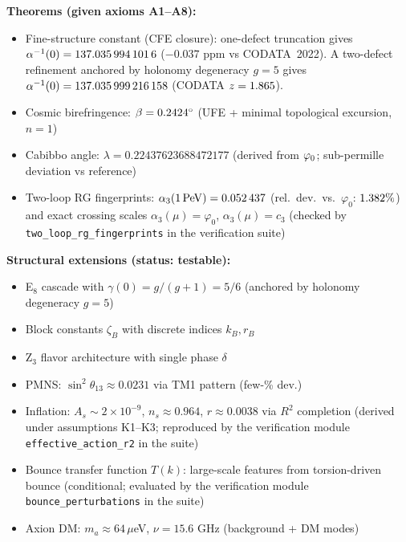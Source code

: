 \vspace{1em}
\begin{tcolorbox}[colback=gray!5, colframe=gray!60, title={\textbf{Claim Map: What This Paper Establishes}}, fonttitle=\bfseries]
\textbf{Theorems (given axioms A1--A8):}
\begin{itemize}[leftmargin=1.5em, topsep=2pt, itemsep=1pt]
    \item Fine-structure constant (CFE closure): one-defect truncation gives $\alpha^{-1}(0)=\num[round-mode=places,round-precision=10]{\TFPTalphaInvSelfNum}$ ($-0.037$ ppm vs CODATA~2022). A two-defect refinement anchored by holonomy degeneracy $g=5$ gives $\alpha^{-1}(0)=\num[round-mode=places,round-precision=12]{\TFPTalphaInvGOverFourNum}$ (CODATA $z=\num[round-mode=places,round-precision=3]{\TFPTalphaZGOverFourNum}$).
    \item Cosmic birefringence: $\beta = \num[round-mode=places,round-precision=4]{\TFPTbetaDegNum}^\circ$ (UFE + minimal topological excursion, $n=1$)
    \item Cabibbo angle: $\lambda = \num[round-mode=places,round-precision=6]{0.22437623688472177}$ (derived from $\varphi_0$; sub-permille deviation vs reference)
    \item Two-loop RG fingerprints: $\alpha_3(1\,\mathrm{PeV})=\num[round-mode=places,round-precision=6]{\TFPTalphaThreePeVNum}$ (rel.\ dev.\ vs.\ $\varphi_0$: $\num[round-mode=places,round-precision=3]{\TFPTalphaThreePeVRelDevPercent}\%$) and exact crossing scales $\alpha_3(\mu)=\varphi_0$, $\alpha_3(\mu)=c_3$ (checked by \texttt{two\_loop\_rg\_fingerprints} in the verification suite)
\end{itemize}

\textbf{Structural extensions (status: testable):}
\begin{itemize}[leftmargin=1.5em, topsep=2pt, itemsep=1pt]
    \item E$_8$ cascade with $\gamma(0)=g/(g+1)=5/6$ (anchored by holonomy degeneracy $g=5$)
    \item Block constants $\zeta_B$ with discrete indices $k_B, r_B$
    \item Z$_3$ flavor architecture with single phase $\delta$
    \item PMNS: $\sin^2\theta_{13} \approx 0.0231$ via TM1 pattern (few-\% dev.)
    \item Inflation: $A_s \sim 2\times10^{-9}$, $n_s \approx 0.964$, $r \approx 0.0038$ via $R^2$ completion (derived under assumptions K1--K3; reproduced by the verification module \texttt{effective\_action\_r2} in the suite)
    \item Bounce transfer function $T(k)$: large-scale features from torsion-driven bounce (conditional; evaluated by the verification module \texttt{bounce\_perturbations} in the suite)
    \item Axion DM: $m_a \approx 64\,\mu$eV, $\nu = 15.6$ GHz (background + DM modes)
\end{itemize}


\end{tcolorbox}
